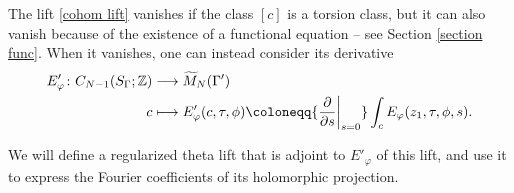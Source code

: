 \documentclass[twoside,a4paper,10pt]{article} %
\newcommand{\Mtil}{\widetilde{M}}
\newcommand{\dds}{\restr{\frac{\partial}{\partial s}}{s=0}}
\newcommand{\8}{\infty}
\newcommand{\Z}{\mathbb{Z}}
\newcommand\restr[2]{{%
  \left.\kern-\nulldelimiterspace %
  #1 %
  \vphantom{\big|} %
  \right|_{#2} %
  }}
\theoremstyle{mytheoremstyle}
\theoremstyle{remark}
\newtheorem{rmk}{Remark}[section]
\numberwithin{equation}{section}
\begin{document}
The lift \eqref{cohom lift} vanishes if the class $[c]$ is a torsion class, but it can also vanish because of the existence of a functional equation -- see Section \ref{section func}.  When it vanishes, one can instead consider its derivative
\begin{align} \label{derivative intro}
E'_\varphi \colon C_{N-1}(S_\Gamma;\Z) & \longrightarrow \Mtil_{N}(\Gamma') \\
 c & \longmapsto E'_\varphi(c,\tau,\phi) \coloneqq \dds \int_c E_\varphi(z_1,\tau,\phi,s).
\end{align}

We will define a regularized theta lift that is adjoint to $E'_\varphi$ of this lift, and use it to express the Fourier coefficients of its holomorphic projection.


%
\end{document}
